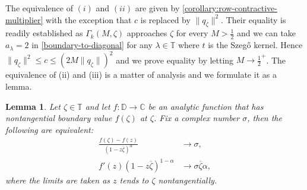 \documentclass[leqno, final]{article}
\newtheorem{lemma}{Lemma}
\theoremstyle{definition}
\newcommand{\disk}{\mathbb{D}}
\newcommand{\plane}{\mathbb{C}}
\newcommand{\torus}{\mathbb{T}}
\begin{document}
The equivalence of $(i)$ and $(ii)$ are given by \cref{corollary:row-contractive-multiplier}
with the exception that $c$ is replaced by $\|q_\zeta\|^2$. Their equality
is readily established as $\Gamma_k(M,\zeta)$ approaches $\zeta$ for every $M>\frac12$
and we can take $a_\lambda = 2$ in \ref{boundary-to-diagonal} for any $\lambda\in\torus$
where $t$ is the Szegő kernel. Hence $\|q_\zeta\|^2\leq c \leq (2M\|q_\zeta\|)^2$ and we prove
equality by letting $M\to\frac12^+$. The equivalence of (ii) and (iii) is a matter of analysis
and we formulate it as a lemma.
\begin{lemma}\label{lemma:weighted-derivative}
Let $\zeta\in\torus$ and let $f:\disk\to\plane$ be an analytic function that has nontangential
boundary value $f(\zeta)$ at $\zeta$. Fix a complex number $\sigma$, then the following are
equivalent: \begin{align}
\label{equation:difference-quotient} \frac{f(\zeta)-f(z)}{(1-z\overline\zeta)^\alpha} &\to \sigma, \\
\label{equation:angular-derivative}  f'(z)(1-z\overline\zeta)^{1-\alpha} &\to \sigma\overline\zeta\alpha,
\end{align}
where the limits are taken as $z$ tends to $\zeta$ nontangentially.
\end{lemma}
\end{document}
